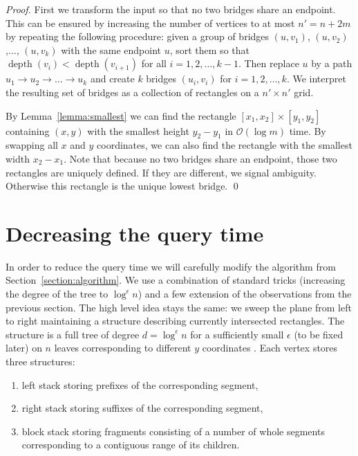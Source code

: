 \documentclass[runningheads]{llncs}
\DeclareMathOperator{\depth}{depth}
\begin{document}
\begin{proof}
First we transform the input so that no two bridges share an endpoint. This can be ensured by increasing the number of vertices to at most $n'=n+2m$ by repeating the following procedure: given a group of bridges $(u,v_{1})$, $(u,v_{2})$ ,$\ldots$, $(u,v_{k})$ with the same endpoint $u$, sort them so that $\depth(v_{i})<\depth(v_{i+1})$ for all $i=1,2,\ldots,k-1$. Then replace $u$ by a path $u_{1}\rightarrow u_{2}\rightarrow\ldots\rightarrow u_{k}$ and create $k$ bridges $(u_{i},v_{i})$ for $i=1,2,\ldots,k$.  We interpret the resulting set of bridges as a collection of rectangles on a $n'\times n'$ grid.

By Lemma~\ref{lemma:smallest} we can find the rectangle $[x_{1},x_{2}]\times[y_{1},y_{2}]$ containing $(x,y)$ with the smallest height $y_{2}-y_{1}$ in $\mathcal{O}(\log m)$ time. By swapping all $x$ and $y$ coordinates, we can also find the rectangle with the smallest width $x_{2}-x_{1}$. Note that because no two bridges share an endpoint, those two rectangles are uniquely defined. If they are different, we signal ambiguity. Otherwise this rectangle is the unique lowest bridge. 
\qed
\end{proof}

\section{Decreasing the query time}
\label{section:algorithm2}

In order to reduce the query time we will carefully modify the algorithm from Section~\ref{section:algorithm}. We use a combination of standard tricks (increasing the degree of the tree to $\log^{\epsilon}n$) and a few extension of the observations from the previous section. The high level idea stays the same: we sweep the plane from left to right maintaining a structure describing currently intersected rectangles.  The structure is a full tree of degree $d=\log^{\epsilon}n$ for a sufficiently small $\epsilon$ (to be fixed later) on $n$ leaves corresponding to different $y$ coordinates . Each vertex stores three structures:

\begin{enumerate}
\item left stack storing prefixes of the corresponding segment,
\item right stack storing suffixes of the corresponding segment,
\item block stack storing fragments consisting of a number of whole segments corresponding to a contiguous range of its children.
\end{enumerate}
\end{document}

